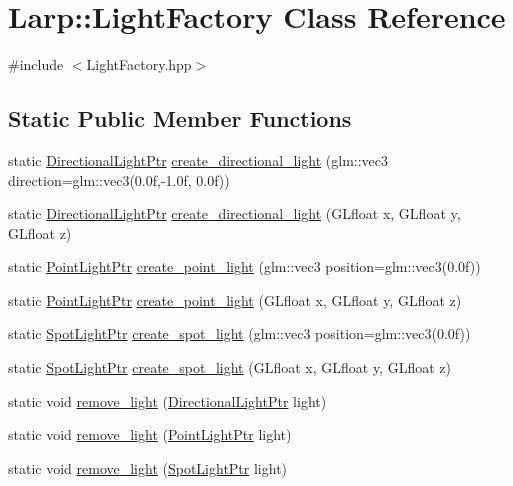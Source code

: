 \hypertarget{classLarp_1_1LightFactory}{}\section{Larp\+:\+:Light\+Factory Class Reference}
\label{classLarp_1_1LightFactory}


{\ttfamily \#include $<$Light\+Factory.\+hpp$>$}

\subsection*{Static Public Member Functions}
\begin{DoxyCompactItemize}
\item 
static \hyperlink{namespaceLarp_a38725e08be7b2ebb94f5f71eb0f0c692}{Directional\+Light\+Ptr} \hyperlink{classLarp_1_1LightFactory_abae642e8bb0ea62f4a3f44af5b4535eb}{create\+\_\+directional\+\_\+light} (glm\+::vec3 direction=glm\+::vec3(0.\+0f,-\/1.\+0f, 0.\+0f))
\item 
static \hyperlink{namespaceLarp_a38725e08be7b2ebb94f5f71eb0f0c692}{Directional\+Light\+Ptr} \hyperlink{classLarp_1_1LightFactory_a31fe8a6adc8034a116b75cc88e083ccc}{create\+\_\+directional\+\_\+light} (G\+Lfloat x, G\+Lfloat y, G\+Lfloat z)
\item 
static \hyperlink{namespaceLarp_a07215808e8e3c5229ca8549c5450e3e5}{Point\+Light\+Ptr} \hyperlink{classLarp_1_1LightFactory_a51bb3fa16d3856a5e5da229d204ae8b7}{create\+\_\+point\+\_\+light} (glm\+::vec3 position=glm\+::vec3(0.\+0f))
\item 
static \hyperlink{namespaceLarp_a07215808e8e3c5229ca8549c5450e3e5}{Point\+Light\+Ptr} \hyperlink{classLarp_1_1LightFactory_a1bb5b1f0a1d3bc202509b9f45c2a1ae7}{create\+\_\+point\+\_\+light} (G\+Lfloat x, G\+Lfloat y, G\+Lfloat z)
\item 
static \hyperlink{namespaceLarp_a5366be98946441fcea9b8a155bc52d95}{Spot\+Light\+Ptr} \hyperlink{classLarp_1_1LightFactory_a676f08c73203b6f3353f72bc00b2cf07}{create\+\_\+spot\+\_\+light} (glm\+::vec3 position=glm\+::vec3(0.\+0f))
\item 
static \hyperlink{namespaceLarp_a5366be98946441fcea9b8a155bc52d95}{Spot\+Light\+Ptr} \hyperlink{classLarp_1_1LightFactory_a3f8e8e6da8b310d5a575be3730850185}{create\+\_\+spot\+\_\+light} (G\+Lfloat x, G\+Lfloat y, G\+Lfloat z)
\item 
static void \hyperlink{classLarp_1_1LightFactory_a41f54895861743c5a4e4b075d5d30c1a}{remove\+\_\+light} (\hyperlink{namespaceLarp_a38725e08be7b2ebb94f5f71eb0f0c692}{Directional\+Light\+Ptr} light)
\item 
static void \hyperlink{classLarp_1_1LightFactory_a5cf3d96ac55349dc728059e39ced3621}{remove\+\_\+light} (\hyperlink{namespaceLarp_a07215808e8e3c5229ca8549c5450e3e5}{Point\+Light\+Ptr} light)
\item 
static void \hyperlink{classLarp_1_1LightFactory_a3408665c94e20ca205f04d1bf4d26ba3}{remove\+\_\+light} (\hyperlink{namespaceLarp_a5366be98946441fcea9b8a155bc52d95}{Spot\+Light\+Ptr} light)
\end{DoxyCompactItemize}
